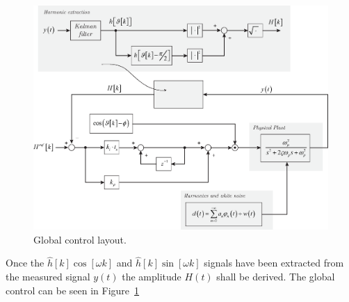 \documentclass[11pt,a4paper,oneside]{book}
\numberwithin{equation}{section}
\theoremstyle{it}
\theoremstyle{definition}
\begin{document}
\begin{figure}[H]
	\centering
	\includegraphics[width = 450pt, angle = 0, 
	keepaspectratio]{figures/shaker/ctrl_layout_1.eps}
	\captionsetup{width=0.5\textwidth, font=small}		
	\caption{Global control layout.}
	\label{ctrl_layout_1}
\end{figure}
Once the $\hat{h}[k]\cos[\omega k]$ and $\hat{h}[k]\sin[\omega k]$ signals have been extracted from the measured signal $y(t)$ the amplitude $H(t)$ shall be derived. The global control can be seen in Figure~\ref{ctrl_layout_1}
\end{document}
